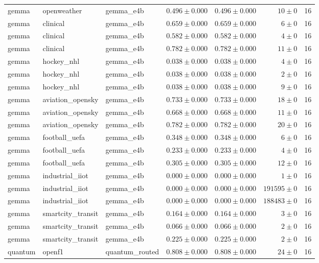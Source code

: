 \begin{table}[htbp]
\begin{tabular}{l l l r r r r}
gemma & openweather & gemma\_e4b & $0.496\pm0.000$ & $0.496\pm0.000$ & $10\pm0$ & 16 \\
gemma & clinical & gemma\_e4b & $0.659\pm0.000$ & $0.659\pm0.000$ & $6\pm0$ & 16 \\
gemma & clinical & gemma\_e4b & $0.582\pm0.000$ & $0.582\pm0.000$ & $4\pm0$ & 16 \\
gemma & clinical & gemma\_e4b & $0.782\pm0.000$ & $0.782\pm0.000$ & $11\pm0$ & 16 \\
gemma & hockey\_nhl & gemma\_e4b & $0.038\pm0.000$ & $0.038\pm0.000$ & $4\pm0$ & 16 \\
gemma & hockey\_nhl & gemma\_e4b & $0.038\pm0.000$ & $0.038\pm0.000$ & $2\pm0$ & 16 \\
gemma & hockey\_nhl & gemma\_e4b & $0.038\pm0.000$ & $0.038\pm0.000$ & $9\pm0$ & 16 \\
gemma & aviation\_opensky & gemma\_e4b & $0.733\pm0.000$ & $0.733\pm0.000$ & $18\pm0$ & 16 \\
gemma & aviation\_opensky & gemma\_e4b & $0.668\pm0.000$ & $0.668\pm0.000$ & $11\pm0$ & 16 \\
gemma & aviation\_opensky & gemma\_e4b & $0.782\pm0.000$ & $0.782\pm0.000$ & $20\pm0$ & 16 \\
gemma & football\_uefa & gemma\_e4b & $0.348\pm0.000$ & $0.348\pm0.000$ & $6\pm0$ & 16 \\
gemma & football\_uefa & gemma\_e4b & $0.233\pm0.000$ & $0.233\pm0.000$ & $4\pm0$ & 16 \\
gemma & football\_uefa & gemma\_e4b & $0.305\pm0.000$ & $0.305\pm0.000$ & $12\pm0$ & 16 \\
gemma & industrial\_iiot & gemma\_e4b & $0.000\pm0.000$ & $0.000\pm0.000$ & $1\pm0$ & 16 \\
gemma & industrial\_iiot & gemma\_e4b & $0.000\pm0.000$ & $0.000\pm0.000$ & $191595\pm0$ & 16 \\
gemma & industrial\_iiot & gemma\_e4b & $0.000\pm0.000$ & $0.000\pm0.000$ & $188483\pm0$ & 16 \\
gemma & smartcity\_transit & gemma\_e4b & $0.164\pm0.000$ & $0.164\pm0.000$ & $3\pm0$ & 16 \\
gemma & smartcity\_transit & gemma\_e4b & $0.066\pm0.000$ & $0.066\pm0.000$ & $2\pm0$ & 16 \\
gemma & smartcity\_transit & gemma\_e4b & $0.225\pm0.000$ & $0.225\pm0.000$ & $2\pm0$ & 16 \\
quantum & openf1 & quantum\_routed & $0.808\pm0.000$ & $0.808\pm0.000$ & $24\pm0$ & 16 \\

\end{tabular}
\end{table}
